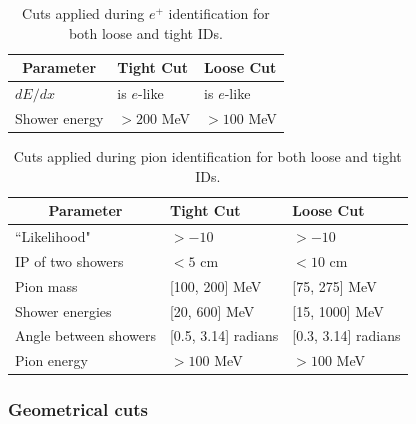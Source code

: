 \documentclass[a4paper, 10pt]{article}
\begin{document}
\begin{table}[!hbtp]
\centering
\caption{Cuts applied during $e^{+}$ identification for both loose and tight IDs.}
\begin{tabular}{|l|l|l|}
\hline
\multicolumn{1}{|c|}{{\bf Parameter}} & {\bf Tight Cut}  & {\bf Loose Cut}  \\ \hline
$dE/dx$                               & is $e$-like 	 & is $e$-like \\ \hline
Shower energy                         & $> 200$ MeV      & $> 100$ MeV      \\ \hline
\end{tabular}
\label{t1}
\end{table}

\begin{table}[!hbtp]
\centering
\caption{Cuts applied during pion identification for both loose and tight IDs.}
\begin{tabular}{|l|l|l|}
\hline
\multicolumn{1}{|c|}{{\bf Parameter}} & {\bf Tight Cut}         & {\bf Loose Cut}         \\ \hline
``Likelihood"                         & $> -10$                 & $> -10 $       		  \\ \hline
IP of two showers                     & $< 5$ cm          		& $< 10$ cm		         \\ \hline
Pion mass                             & {[}100, 200{]} MeV      & {[}75, 275{]} MeV       \\ \hline
Shower energies                       & {[}20, 600{]} MeV       & {[}15, 1000{]} MeV      \\ \hline
Angle between showers                 & {[}0.5, 3.14{]} radians & {[}0.3, 3.14{]} radians \\ \hline
Pion energy                           & $> 100$ MeV             & $> 100$ MeV             \\ \hline
\end{tabular}
\label{t2}
\end{table}

\subsubsection{Geometrical cuts}
\end{document}

